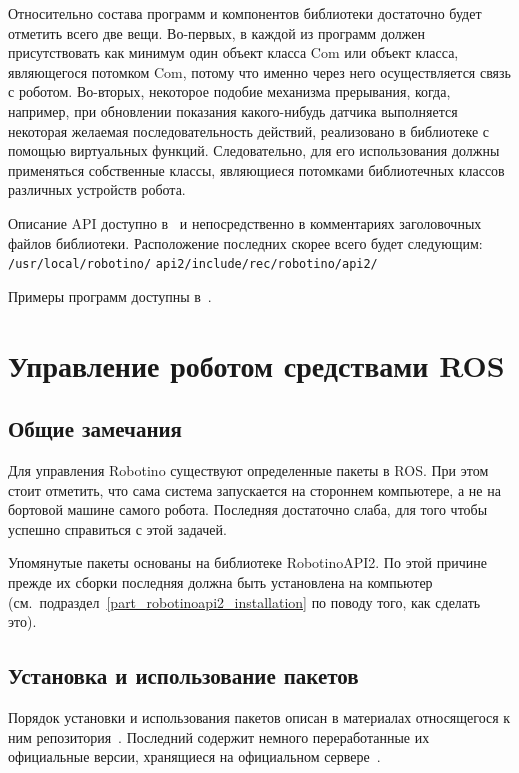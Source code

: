 Относительно состава программ и компонентов библиотеки достаточно будет отметить всего две вещи.
Во-первых, в каждой из программ должен присутствовать как минимум один объект класса Com или объект класса, являющегося потомком Com, потому что именно через него осуществляется связь с роботом.
Во-вторых, некоторое подобие механизма прерывания, когда, например, при обновлении показания какого-нибудь датчика выполняется некоторая желаемая последовательность действий, реализовано в библиотеке с помощью виртуальных функций.
Следовательно, для его использования должны применяться собственные классы, являющиеся потомками библиотечных классов различных устройств робота.

Описание API доступно в~\cite{api2_documentation} и непосредственно в комментариях заголовочных файлов библиотеки.
Расположение последних скорее всего будет следующим: \verb|/usr/local/robotino/| \verb|api2/include/rec/robotino/api2/|

Примеры программ доступны в~\cite{robotino_examples}.



\section{Управление роботом средствами ROS}
\subsection{Общие замечания}
Для управления Robotino существуют определенные пакеты в ROS.
При этом стоит отметить, что сама система запускается на стороннем компьютере, а не на бортовой машине самого робота.
Последняя достаточно слаба, для того чтобы успешно справиться с этой задачей.

Упомянутые пакеты основаны на библиотеке RobotinoAPI2.
По этой причине прежде их сборки последняя должна быть установлена на компьютер (см.~подраздел~\ref{part_robotinoapi2_installation} по поводу того, как сделать это).


\subsection{Установка и использование пакетов}
Порядок установки и использования пакетов описан в материалах относящегося к ним репозитория~\cite{robotino}.
Последний содержит немного переработанные их официальные версии, хранящиеся на официальном сервере~\cite{official_packages}.
